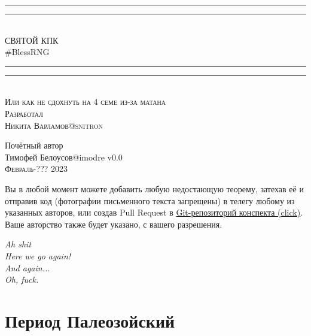 \documentclass{article}
\begin{document}
\begin{titlepage}
    \centering
    \vspace*{\baselineskip}
    \rule{\textwidth}{1.6pt}\vspace*{-\baselineskip}\vspace*{2pt}
    \rule{\textwidth}{0.4pt}\\[\baselineskip]
    {\LARGE СВЯТОЙ КПК\\ [0.3\baselineskip] \#BlessRNG}\\[0.2\baselineskip]
    \rule{\textwidth}{0.4pt}\vspace*{-\baselineskip}\vspace{3.2pt}
    \rule{\textwidth}{1.6pt}\\[\baselineskip]
    \scshape
    Или как не сдохнуть на 4 семе из-за матана \\
    \vspace*{2\baselineskip}
    Разработал \\[\baselineskip]
    {\Large Никита Варламов\quad @snitron}
        \vspace*{2\baselineskip}\par
    Почётный автор \\[\baselineskip]
    {\Large Тимофей Белоусов\quad @imodre}
    \vfill
    v0.0\\
    {\scshape Февраль-??? 2023} \par
\end{titlepage}

Вы в любой момент можете добавить любую недостающую теорему, затехав её и отправив код (фотографии письменного текста запрещены) в телегу любому из указанных авторов, или создав Pull Request в \href{https://github.com/snitron/ct-itmo}{Git-репозиторий конспекта (click)}. Ваше авторство также будет указано, с вашего разрешения.

\newpage

\begin{flushright}
\emph{Ah shit\\
Here we go again!\\
And again...\\
Oh, fuck.}
\end{flushright}


\tableofcontents


\setlength{\parskip}{6pt}%
\newpage
{}


\section{Период Палеозойский}
\end{document}
